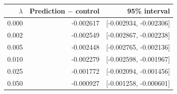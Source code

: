 \begin{tabular}{rrr}
\toprule
$\lambda$ & Prediction $-$ control & 95\% interval \\
\midrule
0.000 & -0.002617 & [-0.002934, -0.002306] \\
0.002 & -0.002549 & [-0.002867, -0.002238] \\
0.005 & -0.002448 & [-0.002765, -0.002136] \\
0.010 & -0.002279 & [-0.002598, -0.001967] \\
0.025 & -0.001772 & [-0.002094, -0.001456] \\
0.050 & -0.000927 & [-0.001258, -0.000601] \\
\bottomrule
\end{tabular}
